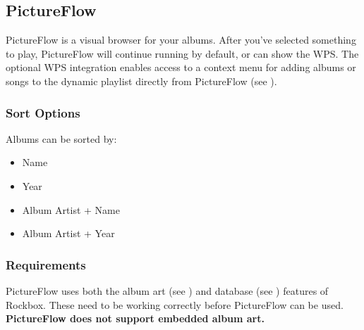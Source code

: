 \subsection{PictureFlow}
PictureFlow is a visual browser for your albums.  After you've selected something to play,
PictureFlow will continue running by default, or can show the WPS. The optional WPS
integration enables access to a context menu for adding albums or songs
to the dynamic playlist directly from PictureFlow (see ).

\subsubsection{Sort Options}
Albums can be sorted by:

\begin{itemize}
    \item Name
    \item Year
    \item Album Artist + Name
    \item Album Artist + Year
\end{itemize}

\subsubsection{Requirements}
PictureFlow uses both the album art (see ) and
database (see ) features of Rockbox.
These need to be working correctly before PictureFlow can be used.
\textbf{PictureFlow does not support embedded album art.}




